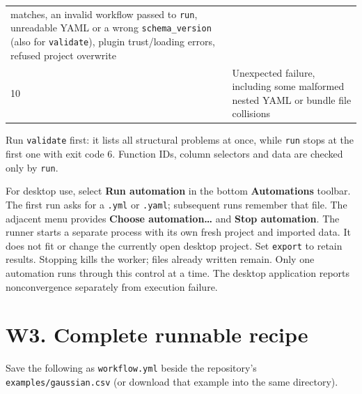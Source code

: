 \documentclass[
  10pt,
  a4paper,
  oneside]{scrreprt}
\begin{document}
\begin{longtable}[]{@{}ll@{}}
\begin{minipage}[t]{0.47\columnwidth}
matches, an invalid workflow passed to \texttt{run}, unreadable YAML or
a wrong \texttt{schema\_version} (also for \texttt{validate}), plugin
trust/loading errors, refused project overwrite\strut
\end{minipage}\tabularnewline
\begin{minipage}[t]{0.47\columnwidth}\raggedright
10\strut
\end{minipage} & \begin{minipage}[t]{0.47\columnwidth}\raggedright
Unexpected failure, including some malformed nested YAML or bundle file
collisions\strut
\end{minipage}\tabularnewline
\bottomrule
\end{longtable}

Run \texttt{validate} first: it lists all structural problems at once,
while \texttt{run} stops at the first one with exit code 6. Function
IDs, column selectors and data are checked only by \texttt{run}.

For desktop use, select \textbf{Run automation} in the bottom
\textbf{Automations} toolbar. The first run asks for a \texttt{.yml} or
\texttt{.yaml}; subsequent runs remember that file. The adjacent menu
provides \textbf{Choose automation\ldots{}} and \textbf{Stop
automation}. The runner starts a separate process with its own fresh
project and imported data. It does not fit or change the currently open
desktop project. Set \texttt{export} to retain results. Stopping kills
the worker; files already written remain. Only one automation runs
through this control at a time. The desktop application reports
nonconvergence separately from execution failure.

\hypertarget{w3.-complete-runnable-recipe}{%
\section{W3. Complete runnable
recipe}\label{w3.-complete-runnable-recipe}}

Save the following as \texttt{workflow.yml} beside the repository's
\texttt{examples/gaussian.csv} (or download that example into the same
directory).
\end{document}

